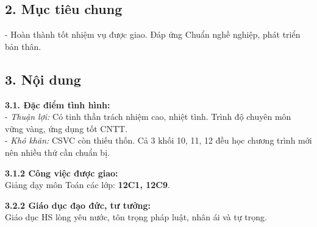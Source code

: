 \documentclass[12pt,a4paper]{article}
\begin{document}
\subsection*{2. Mục tiêu chung}
- Hoàn thành tốt nhiệm vụ được giao. Đáp ứng Chuẩn nghề nghiệp, phát triển bản thân.

\subsection*{3. Nội dung}
\textbf{3.1. Đặc điểm tình hình:}\\
- \textit{Thuận lợi:} Có tinh thần trách nhiệm cao, nhiệt tình. Trình độ chuyên môn vững vàng, ứng dụng tốt CNTT.\\
- \textit{Khó khăn:} CSVC còn thiếu thốn. Cả 3 khối 10, 11, 12 đều học chương trình mới nên nhiều thứ cần chuẩn bị.

\textbf{3.1.2 Công việc được giao:}\\
Giảng dạy môn Toán các lớp: \textbf{12C1, 12C9}.

\textbf{3.2.2 Giáo dục đạo đức, tư tưởng:}\\
Giáo dục HS lòng yêu nước, tôn trọng pháp luật, nhân ái và tự trọng.

\newpage
\end{document}
